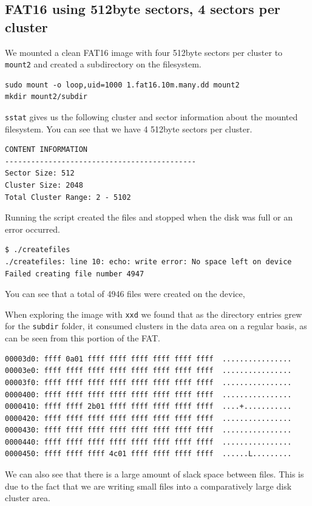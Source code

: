 \documentclass[a4paper,
    11pt,
    normalheadings,
    parindent,
    UKenglish,
    abstracton,
    ]{scrartcl}
\begin{document}
\subsection{FAT16 using 512byte sectors, 4 sectors per cluster}
We mounted a clean FAT16 image with four 512byte sectors per cluster to \texttt{mount2} and created a subdirectory on the filesystem.

\begin{verbatim}
sudo mount -o loop,uid=1000 1.fat16.10m.many.dd mount2
mkdir mount2/subdir
\end{verbatim}

\texttt{sstat} gives us the following cluster and sector information about the mounted filesystem. You can see that we have 4 512byte sectors per cluster.
\begin{verbatim}
CONTENT INFORMATION
--------------------------------------------
Sector Size: 512
Cluster Size: 2048
Total Cluster Range: 2 - 5102
\end{verbatim}

Running the script created the files and stopped when the disk was full or an error occurred.
\begin{verbatim}
$ ./createfiles
./createfiles: line 10: echo: write error: No space left on device
Failed creating file number 4947
\end{verbatim}
You can see that a total of 4946 files were created on the device,

When exploring the image with \texttt{xxd} we found that as the directory entries grew for the \texttt{subdir} folder, it consumed clusters in the data area on a regular basis, as can be seen from this portion of the FAT.

\begin{verbatim}
00003d0: ffff 0a01 ffff ffff ffff ffff ffff ffff  ................
00003e0: ffff ffff ffff ffff ffff ffff ffff ffff  ................
00003f0: ffff ffff ffff ffff ffff ffff ffff ffff  ................
0000400: ffff ffff ffff ffff ffff ffff ffff ffff  ................
0000410: ffff ffff 2b01 ffff ffff ffff ffff ffff  ....+...........
0000420: ffff ffff ffff ffff ffff ffff ffff ffff  ................
0000430: ffff ffff ffff ffff ffff ffff ffff ffff  ................
0000440: ffff ffff ffff ffff ffff ffff ffff ffff  ................
0000450: ffff ffff ffff 4c01 ffff ffff ffff ffff  ......L.........
\end{verbatim}

We can also see that there is a large amount of slack space between files. This is due to the fact that we are writing small files into a comparatively large disk cluster area.
\end{document}
